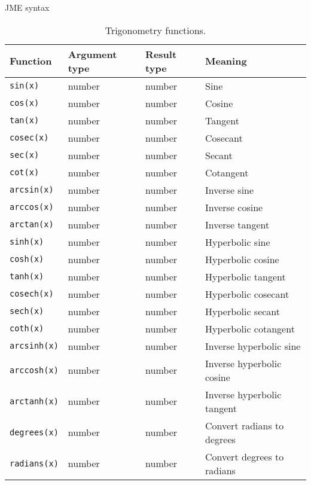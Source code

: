 \begin{chapter}{\label{cha:jme_syntax}JME syntax}
  \begin{sidewaystable}[ht]
  	\centering
  	\begin{tabular}{llll}
  		\hline
  		Function & Argument type & Result type & Meaning \\
  		\hline
  		\verb"sin(x)"			& number & number & Sine \\
  		\verb"cos(x)"			& number & number & Cosine \\
  		\verb"tan(x)"			& number & number & Tangent \\
  		\verb"cosec(x)"		& number & number & Cosecant \\
  		\verb"sec(x)"			& number & number & Secant \\
  		\verb"cot(x)"			& number & number & Cotangent \\
  		\verb"arcsin(x)"	& number & number & Inverse sine \\
  		\verb"arccos(x)"	& number & number & Inverse cosine \\
  		\verb"arctan(x)"	& number & number & Inverse tangent \\
  		\verb"sinh(x)"		& number & number & Hyperbolic sine \\
  		\verb"cosh(x)"		& number & number & Hyperbolic cosine \\
  		\verb"tanh(x)"		& number & number & Hyperbolic tangent \\
  		\verb"cosech(x)"	& number & number & Hyperbolic cosecant \\
  		\verb"sech(x)"		& number & number & Hyperbolic secant \\
  		\verb"coth(x)"		& number & number & Hyperbolic cotangent\\
  		\verb"arcsinh(x)"	& number & number & Inverse hyperbolic sine \\
  		\verb"arccosh(x)"	& number & number & Inverse hyperbolic cosine \\
  		\verb"arctanh(x)"	& number & number & Inverse hyperbolic tangent \\
  		\verb"degrees(x)"	& number & number & Convert radians to degrees \\
  		\verb"radians(x)"	& number & number & Convert degrees to radians \\
  	\end{tabular}
  	\caption{\label{tab:trigfunctions}
  		Trigonometry functions.
  	}
  \end{sidewaystable}


\end{chapter}
